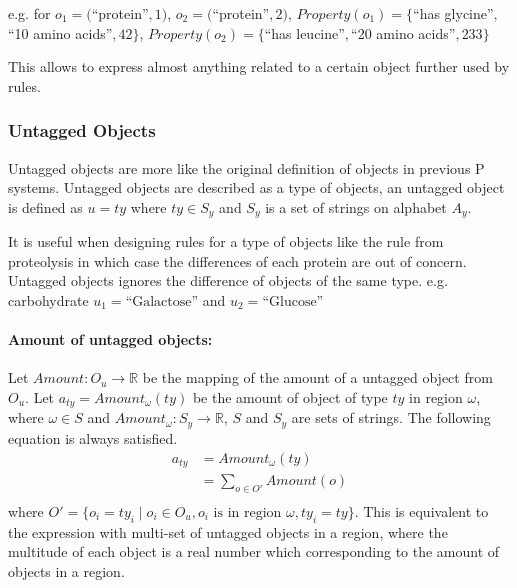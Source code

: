 \documentclass[9pt,a4paper,twoside]{article}
\begin{document}
                e.g. for
                $o_1 = ($``protein''$, 1)$,
                $o_2 = ($``protein''$, 2)$,
                $Property(o_1) = \{$``has glycine''$,$``10 amino acids''$,42\}$,
                $Property(o_2) = \{$``has leucine''$,$``20 amino acids''$,233\}$
                
                This allows to express almost anything related to a certain object further used by rules.
                            
        \subsubsection{Untagged Objects}
                
            Untagged objects are more like the original definition of objects in previous P systems.
            Untagged objects are described as a type of objects, an untagged object is defined as $u = ty$ where $ty \in S_y$ and $S_y$ is a set of strings on alphabet $A_y$. 
            
            It is useful when designing rules for a type of objects like the rule from proteolysis in which case the differences of each protein are out of concern.
            Untagged objects ignores the difference of objects of the same type. e.g. carbohydrate $u_1 = \text{``Galactose''}$ and $u_2 = \text{``Glucose''} $
            \paragraph{Amount of untagged objects:}
            
                Let $Amount: O_u \rightarrow \mathbb{R}$ be the mapping of the amount of a untagged object from $O_u$.
                Let $a_{ty} = Amount_\omega(ty)$ be the amount of object of type $ty$ in region $\omega$, where $\omega \in S$ and $Amount_\omega: S_y \rightarrow \mathbb{R}$, 
                $S$ and $S_y$ are sets of strings. The following equation is always satisfied.
                \begin{equation}
                    \begin{align}
                        a_{ty} &= Amount_\omega(ty) \\
                        &= \sum_{o \in O'}{Amount(o)} \\
                    \end{align}
                \end{equation}
                where $O' = \{ o_i = ty_i \mid o_i \in O_u, o_i\text{ is in region }\omega, ty_i = ty \} $. This is equivalent to the expression with multi-set of 
                untagged objects in a region, where the multitude of each object is a real number which corresponding to the amount of objects in a region. 
            
\end{document}
